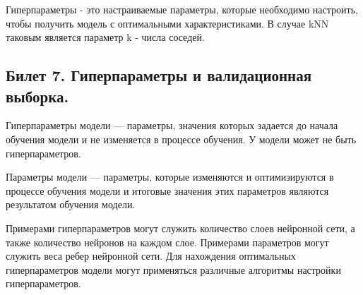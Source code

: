 \documentclass[a4paper, 12pt]{article}
\begin{document}
	Гиперпараметры - это настраиваемые параметры, которые необходимо настроить, чтобы получить модель с оптимальными характеристиками. В случае kNN таковым является параметр k - числа соседей.
	\subsection*{Билет 7. Гиперпараметры и валидационная выборка.}
	Гиперпараметры модели — параметры, значения которых задается до начала обучения модели и не изменяется в процессе обучения. У модели может не быть гиперпараметров.
	
	Параметры модели — параметры, которые изменяются и оптимизируются в процессе обучения модели и итоговые значения этих параметров являются результатом обучения модели.
	
	Примерами гиперпараметров могут служить количество слоев нейронной сети, а также количество нейронов на каждом слое. Примерами параметров могут служить веса ребер нейронной сети.
	Для нахождения оптимальных гиперпараметров модели могут применяться различные алгоритмы настройки гиперпараметров.
\end{document}

